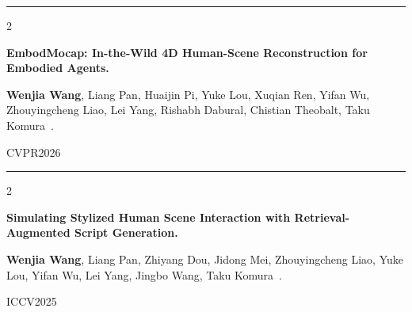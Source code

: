 \documentclass[10pt, letterpaper]{article}
\newenvironment{twocolentry}[2][]{
    \onecolentry
    \def\secondColumn{#2}
    \setcolumnwidth{\fill, 4.5 cm}
    \begin{paracol}{2}
}{
    \switchcolumn \raggedleft \secondColumn
    \end{paracol}
    \endonecolentry
} %
\begin{document}



        
{\color{gray!40}\noindent\rule{0.98\textwidth}{0.3pt}}

        \begin{samepage}
            \begin{twocolentry}{
                CVPR2026
            }
                \textbf{EmbodMocap: In-the-Wild 4D Human-Scene Reconstruction for Embodied Agents.}

                \vspace{0.10 cm}
                \small\textbf{Wenjia Wang}, Liang Pan, Huaijin Pi, Yuke Lou, Xuqian Ren, Yifan Wu, Zhouyingcheng Liao, Lei Yang, Rishabh Dabural, Chistian Theobalt, Taku Komura~\Letter.
            \end{twocolentry}


             \vspace{-0.15 cm}
        \end{samepage}
        {\color{gray!40}\noindent\rule{0.98\textwidth}{0.3pt}}
        
        \begin{samepage}
            \begin{twocolentry}{
                ICCV2025
            }
                \textbf{Simulating Stylized Human Scene Interaction with Retrieval-Augmented Script Generation. }

                \vspace{0.10 cm}
                \small\textbf{Wenjia Wang}, Liang Pan, Zhiyang Dou, Jidong Mei, Zhouyingcheng Liao, Yuke Lou, Yifan Wu, Lei Yang, Jingbo Wang\Letter, Taku Komura~\Letter.
            \end{twocolentry}


            \vspace{-0.15 cm}
        \end{samepage}
\end{document}
